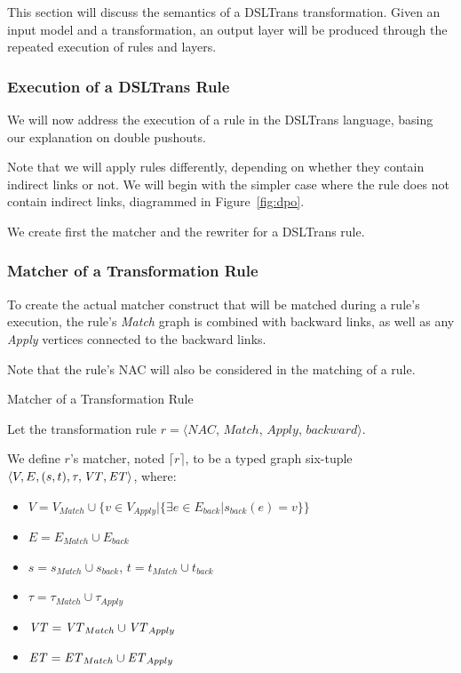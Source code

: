 This section will discuss the semantics of a DSLTrans transformation. Given an input model and a transformation, an output layer will be produced through the repeated execution of rules and layers.



\subsubsection*{Execution of a DSLTrans Rule}

We will now address the execution of a rule in the DSLTrans language, basing our explanation on double pushouts.

Note that we will apply rules differently, depending on whether they contain indirect links or not. We will begin with the simpler case where the rule does not contain indirect links, diagrammed in Figure~\ref{fig:dpo}.

We create first the matcher and the rewriter for a DSLTrans rule.


\subsubsection*{Matcher of a Transformation Rule}

To create the actual matcher construct that will be matched during a rule's execution, the rule's \textit{Match} graph is combined with backward links, as well as any \textit{Apply} vertices connected to the backward links.

Note that the rule's NAC will also be considered in the matching of a rule.

\begin{definition}{Matcher of a Transformation Rule\\}
\label{def:matcher_transformation_rule}

Let the transformation rule $r = \big\langle \mathit{NAC}$, $\mathit{Match}$, $\mathit{Apply}$, $\mathit{backward}\big\rangle$.

We define $r$'s matcher, noted $\lceil r \rceil$, to be a typed graph six-tuple $\langle V,E,(s,t),\tau, \mathit{VT}, \mathit{ET}\rangle$, where:
\begin{itemize}
\item $V = V_{Match} \cup \big\{v \in V_{Apply} | \{\exists e \in E_{back} | s_{back}(e) = v\}\big\}$
\item $E = E_{Match} \cup E_{back}$
\item $s = s_{Match} \cup s_{back}$, $t = t_{Match} \cup t_{back}$
\item $\tau = \tau_{Match} \cup \tau_{Apply}$
\item $\mathit{VT} = \mathit{VT}_{Match} \cup \mathit{VT}_{Apply}$
\item $\mathit{ET} = \mathit{ET}_{Match} \cup \mathit{ET}_{Apply}$
\end{itemize}

\end{definition}


